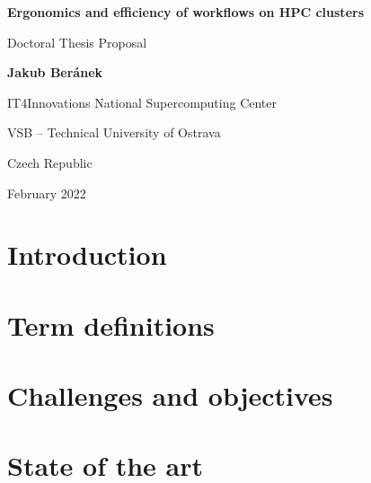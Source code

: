 \documentclass[11pt]{article}
\begin{document}
\begin{titlepage}
    \begin{center}
        \vspace*{1cm}
        \par
        \Huge
        \textbf{Ergonomics and efficiency of workflows on HPC clusters}
        \par
        \vspace{0.5cm}
        \LARGE
        Doctoral Thesis Proposal
        \par
        \vspace{1.5cm}
        \par
        \textbf{Jakub Beránek}
        \par
        \vspace{6cm}
        \par
        {
            \Large
            IT4Innovations National Supercomputing Center\par
            VSB -- Technical University of Ostrava\par
            Czech Republic\par
            February 2022
        }
    \end{center}

    \vspace{1.5cm}
\end{titlepage}

\tableofcontents
\clearpage

\section{Introduction}
\label{sec:introduction}


\section{Term definitions}
\label{sec:task_graph_definition}


\section{Challenges and objectives}
\label{sec:challenges}


\section{State of the art}
\label{sec:state_of_the_art}

\end{document}
